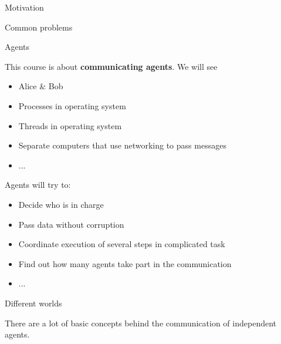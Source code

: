 \begin{section}{Motivation}
\begin{frame}{Common problems}
\end{frame}


\begin{frame}{Agents}

This course is about \textbf{communicating agents}. We will see
\begin{itemize}
    \item Alice \& Bob
    \item Processes in operating system
    \item Threads in operating system
    \item Separate computers that use networking to pass messages
    \item ...
\end{itemize}

Agents will try to:
\begin{itemize}
    \item Decide who is in charge
    \item Pass data without corruption
    \item Coordinate execution of several steps in complicated task
    \item Find out how many agents take part in the communication  
    \item ...
\end{itemize}

\end{frame}

\begin{frame}{Different worlds}

There are a lot of basic concepts behind the communication of independent agents.


\end{frame}
\end{section}
